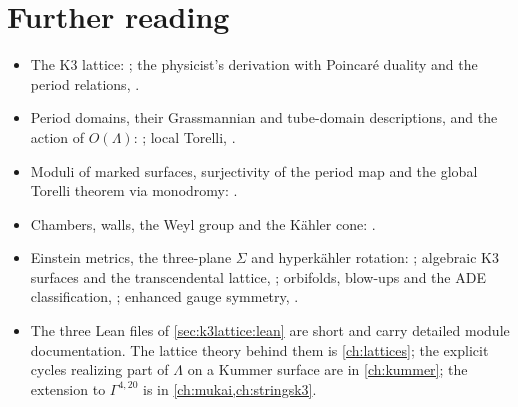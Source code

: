 \section*{Further reading}
\begin{itemize}[leftmargin=*,itemsep=2pt]
\item The K3 lattice: ;
 the physicist's derivation with Poincaré duality and the period relations,
 .
\item Period domains, their Grassmannian and tube-domain descriptions, and the action of
 $O(\Lambda)$: ; local Torelli,
 .
\item Moduli of marked surfaces, surjectivity of the period map and the global Torelli theorem
 via monodromy: .
\item Chambers, walls, the Weyl group and the Kähler cone:
 .
\item Einstein metrics, the three-plane $\Sigma$ and hyperkähler rotation:
 ; algebraic K3 surfaces and the transcendental lattice,
 ; orbifolds, blow-ups and the ADE classification,
 ; enhanced gauge symmetry,
 .
\item The three Lean files of \cref{sec:k3lattice:lean} are short and carry detailed module
 documentation.
 The lattice theory behind them is \cref{ch:lattices}; the explicit cycles realizing part of
 $\Lambda$ on a Kummer surface are in \cref{ch:kummer}; the extension to $\Gamma^{4,20}$ is in
 \cref{ch:mukai,ch:stringsk3}.
\end{itemize}
